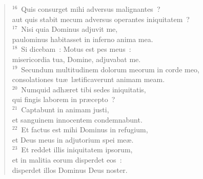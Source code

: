 \begin{flushleft}
\begin{verse}
${}^{16}$~Quis consurget mihi adversus malignantes~?\\ aut quis stabit mecum adversus operantes iniquitatem~?\\
${}^{17}$~Nisi quia Dominus adjuvit me,\\ paulominus habitasset in inferno anima mea.\\
${}^{18}$~Si dicebam~: Motus est pes meus~:\\ misericordia tua, Domine, adjuvabat me.\\
${}^{19}$~Secundum multitudinem dolorum meorum in corde meo,\\ consolationes tu\ae\ l\ae tificaverunt animam meam.\\
${}^{20}$~Numquid adh\ae ret tibi sedes iniquitatis,\\ qui fingis laborem in pr\ae cepto~?\\
${}^{21}$~Captabunt in animam justi,\\ et sanguinem innocentem condemnabunt.\\
${}^{22}$~Et factus est mihi Dominus in refugium,\\ et Deus meus in adjutorium spei me\ae .\\
${}^{23}$~Et reddet illis iniquitatem ipsorum,\\ et in malitia eorum disperdet eos~:\\ disperdet illos Dominus Deus noster.\end{verse}\end{flushleft}



